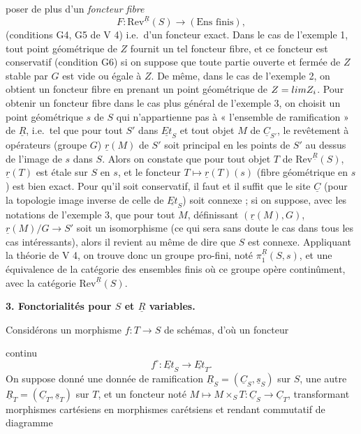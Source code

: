 \documentclass[11pt,a4paper]{article}
\begin{document}
poser de plus d'un \emph{foncteur fibre}
\[
  F : \mathrm{Rev}^{\underline{R}}(S) \longrightarrow (\text{Ens finis}) ,
\]
(conditions G4, G5 de V 4) i.e.\ d'un foncteur exact. Dans le cas de l'exemple
1, tout point géométrique de $Z$ fournit un tel foncteur fibre, et ce foncteur
est conservatif (condition G6) si on suppose que toute partie ouverte et fermée
de $Z$ stable par $G$ est vide ou égale à $Z$. De même, dans le cas de
l'exemple 2, on obtient un \struck{\ill{}} foncteur fibre en prenant un point
géométrique de $Z = \varprojlim Z_i$. Pour obtenir un foncteur fibre dans le
cas plus général de l'exemple 3, on choisit un point géométrique $s$ de $S$
\struck{\ill{}} qui n'appartienne pas à \struck{\ill{}} « l'ensemble de
ramification » de $\underline{R}$, i.e.\ tel que pour tout $S'$ dans
$\underline{Et}_S$ et tout objet $M$ de $\underline{C}_{S'}$, le revêtement à
opérateurs (groupe $G$) $\underline{r}(M)$ \struck{\ill{}} de $S'$ soit
principal en les points de $S'$ au dessus de l'image de $s$ dans $S$. Alors
\struck{\ill{}} on constate que pour tout objet $T$ de
$\mathrm{Rev}^{\underline{R}}(S)$, $\underline{r}(T)$ est étale sur $S$ en $s$,
et le foncteur $T \mapsto \underline{r}(T)(s)$ (fibre géométrique en $s$) est
bien exact. Pour qu'il soit conservatif, il faut et il suffit que le site
$\underline{C}$ (pour la topologie image inverse de celle de $\underline{Et}_S$)
soit connexe ; \struck{\ill{}} si on suppose, avec les notations de l'exemple
3, que pour tout $M$, définissant $(\underline{r}(M), G)$,
$\underline{r}(M)/G \to S'$ soit un isomorphisme (ce qui sera sans doute le cas
dans tous les cas intéressants), alors il revient au même de dire que $S$ est
connexe. Appliquant la théorie de V 4, on trouve donc un groupe pro-fini, noté
$\pi_1^{\underline{R}}(S, s)$, \struck{\ill{}} et une équivalence de la
catégorie des ensembles finis où ce groupe opère continûment, avec la catégorie
$\mathrm{Rev}^{\underline{R}}(S)$.

\textbf{3. Fonctorialités pour $S$ et $\underline{R}$ variables.}

Considérons un morphisme $f : T \to S$ de schémas, d'où un foncteur

continu
\[
  f^{\circ} : \underline{Et}_S \longrightarrow \underline{Et}_T .
\]
On suppose donné une donnée de ramification $\underline{R}_S =
(\underline{C}_S, \underline{s}_S)$ sur $S$, une autre $\underline{R}_T =
(\underline{C}_T, \underline{s}_T)$ sur $T$, et un foncteur noté
$M \mapsto M \times_S T : \underline{C}_S \to \underline{C}_T$, transformant
morphismes cartésiens en morphismes carétsiens et rendant commutatif de
diagramme
\end{document}
